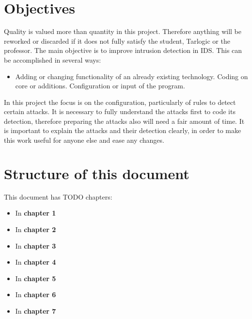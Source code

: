\section{Objectives}
Quality is valued more than quantity in this project. Therefore anything will be reworked or discarded if it does not fully satisfy the student, Tarlogic or the professor.
\linej
\linej
The main objective is to improve intrusion detection in IDS. This can be accomplished in several ways:
\begin{itemize}
	\item Adding or changing functionality of an already existing technology.
		\subitem Coding on core or additions.
		\subitem Configuration or input of the program.
\end{itemize}
\linej
In this project the focus is on the configuration, particularly of rules to detect certain attacks. It is necessary to fully understand the attacks first to code its detection, therefore preparing the attacks also will need a fair amount of time.
It is important to explain the attacks and their detection clearly, in order to make this work useful for anyone else and ease any changes.

\section{Structure of this document}
This document has TODO chapters:
\begin{itemize}
	\item In \textbf{chapter 1} 
	\item In \textbf{chapter 2} 
	\item In \textbf{chapter 3} 
	\item In \textbf{chapter 4} 
	\item In \textbf{chapter 5} 
	\item In \textbf{chapter 6} 
	\item In \textbf{chapter 7} 
\end{itemize}

